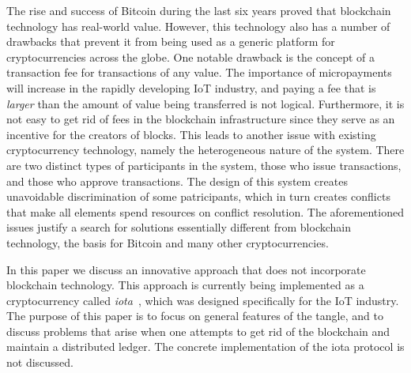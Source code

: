 \documentclass[12pt]{article}
\begin{document}
The rise and success of Bitcoin during the last six
years proved that blockchain technology has real-world value.
However, this technology also has a number of drawbacks
that prevent it from being used as a generic platform for 
cryptocurrencies across the globe. One notable drawback is the
concept of a transaction fee for transactions of any value.
The importance of micropayments will increase in the 
rapidly developing IoT industry, and paying a fee that is \emph{larger}
than the amount of value being transferred is not logical. 
Furthermore, it is not easy to get rid of fees in the blockchain 
infrastructure since they serve as an incentive for the creators of
 blocks. This leads to another issue with existing cryptocurrency 
technology, namely the heterogeneous nature of the system. There
are two distinct types of participants in the system, those who issue 
transactions, and those who approve transactions. 
The design of this system creates unavoidable discrimination of 
some patricipants, which 
in turn creates conflicts that make all elements spend resources 
on conflict resolution. The aforementioned issues justify a search 
for solutions essentially different from blockchain technology, the 
basis for Bitcoin and many other cryptocurrencies.

In this paper we discuss 
an innovative approach that does not incorporate blockchain 
technology. This approach is currently being implemented as 
a cryptocurrency called \emph{iota}~\cite{iota}, which was designed 
specifically for the IoT industry. The purpose of this paper 
is to focus on general features of the tangle,
 and to discuss problems that arise 
when one attempts to get rid of the blockchain and maintain 
a distributed ledger. The concrete implementation of the iota 
protocol is not discussed.
  
\end{document}
